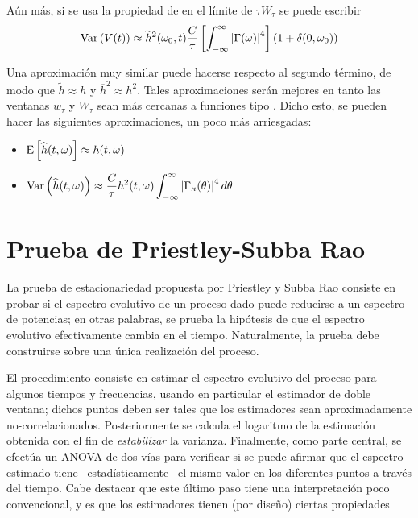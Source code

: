 Aún más, si se usa la propiedad de en el límite de $\tau W_\tau$ se puede escribir
\begin{equation}
\mathrm{Var}\left( V(t) \right) \approx 
\widetilde{h}^{2}(\omega_0,t) \frac{C}{\tau} \left[ \int_{-\infty}^{\infty} \left| \Gamma(\omega) \right|^{4} \right] (1+\delta(0,\omega_0))
\end{equation}

Una aproximación muy similar 
puede hacerse respecto al segundo término, de modo que $\widetilde{h}\approx h$ y 
$\overline{h}^{2}\approx h^{2}$.
Tales aproximaciones serán mejores en tanto las ventanas $w_{\tau}$ y $W_{\tau}$ sean más 
cercanas a funciones tipo \dirac.
Dicho esto, se pueden hacer las siguientes aproximaciones, un poco más arriesgadas:
\begin{itemize}
\item $\displaystyle \mathrm{E}\left[ \widehat{ h }(t,\omega) \right] \approx h(t,\omega)$
\item $\displaystyle \mathrm{Var}\left( \widehat{ h }(t,\omega) \right) \approx 
\frac{C}{\tau} h^{2}(t,\omega) \int_{-\infty}^{\infty} \left| \Gamma_\kappa (\theta) \right|^{4} d\theta$
\end{itemize}


\section{Prueba de Priestley-Subba Rao}
\label{sec:psr}

La prueba de estacionariedad propuesta por Priestley y Subba Rao \cite{Priestley69} consiste en 
probar si el espectro evolutivo de un proceso dado puede reducirse a un espectro de potencias; en otras palabras, se prueba la hipótesis de que el espectro evolutivo efectivamente cambia en el tiempo. 
%
Naturalmente, la prueba debe construirse sobre una única realización del proceso.

El procedimiento consiste en estimar el espectro evolutivo del proceso para algunos tiempos y frecuencias, usando en particular el estimador de doble ventana; dichos puntos deben ser tales que los estimadores sean aproximadamente no-correlacionados.
%
Posteriormente se calcula el logaritmo de la estimación obtenida con el fin de \textit{estabilizar} la varianza.
%
Finalmente, como parte central, se efectúa un ANOVA de dos vías para verificar si se puede afirmar que el espectro estimado tiene --estadísticamente-- el mismo valor en los diferentes puntos a través del tiempo.
%
Cabe destacar que este último paso tiene una interpretación poco convencional, y es que los estimadores tienen (por diseño) ciertas propiedades

